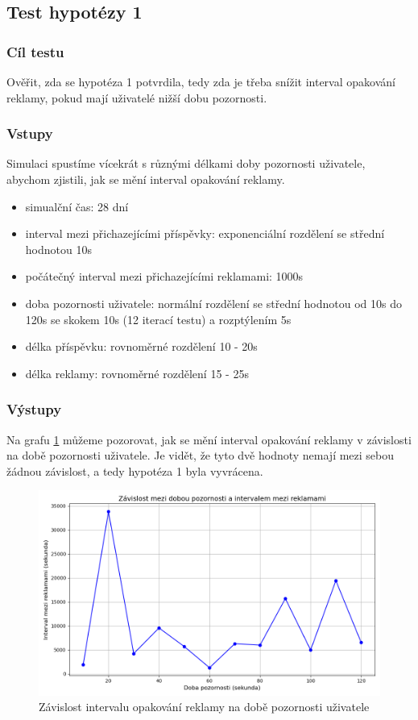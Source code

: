 \documentclass[11pt, a4paper]{article}
\begin{document}
\subsection{Test hypotézy 1}

\subsubsection{Cíl testu}
Ověřit, zda se hypotéza 1 potvrdila, tedy zda je třeba snížit interval opakování reklamy, pokud mají uživatelé nižší dobu pozornosti.
\subsubsection{Vstupy}
Simulaci spustíme vícekrát s různými délkami doby pozornosti uživatele, abychom zjistili, jak se mění interval opakování reklamy.
\begin{itemize}
    \item simualční čas: 28 dní
    \item interval mezi přichazejícími příspěvky: exponenciální rozdělení se střední hodnotou 10s
    \item počátečný interval mezi přichazejícími reklamami: 1000s
    \item doba pozornosti uživatele: normální rozdělení se střední hodnotou od 10s do 120s se skokem 10s (12 iterací testu) a rozptýlením 5s
    \item délka příspěvku: rovnoměrné rozdělení 10 - 20s
    \item délka reklamy: rovnoměrné rozdělení 15 - 25s
\end{itemize}

\subsubsection{Výstupy}

Na grafu \ref{fig:attention_time_vs_ad_interval} můžeme pozorovat, jak se mění interval opakování reklamy v závislosti na době pozornosti uživatele.
Je vidět, že tyto dvě hodnoty nemají mezi sebou žádnou závislost, a tedy hypotéza 1 byla vyvrácena.
\begin{figure}[h]
    \centering
    \includegraphics[width=\linewidth]{attention_time_vs_ad_interval.png}
    \caption{Závislost intervalu opakování reklamy na době pozornosti uživatele}
    \label{fig:attention_time_vs_ad_interval}
\end{figure}
\end{document}
